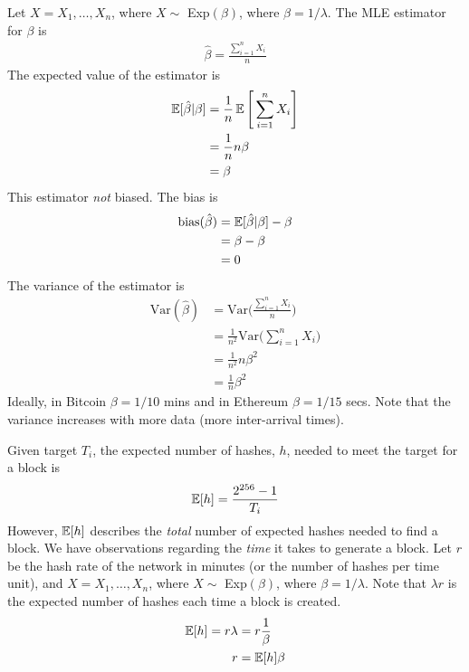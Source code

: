 Let $X = X_1, \dots, X_{n}$, where $X \sim$ Exp$(\beta)$, where $\beta = 1/\lambda$. The MLE estimator for $\beta$ is
\begin{align}
\hat{\beta} = \frac{\sum_{i=1}^{n} X_i}{n}
\end{align}
The expected value of the estimator is 
\begin{align}
\operatorname{\mathbb{E}}[\hat{\beta} | \beta] &= \frac{1}{n}\operatorname{\mathbb{E}} \Bigg[\sum_{i=1}^{n} X_i \Bigg] \\
&= \frac{1}{n}n\beta \\
&= \beta
\end{align}
This estimator \textit{not} biased. The bias is
\begin{align}
\text{bias}(\hat{\beta}) &= \operatorname{\mathbb{E}}[\hat{\beta} | \beta] - \beta \\
&= \beta - \beta \\
&= 0
\end{align}
The variance of the estimator is
\begin{align}
\text{Var}(\hat{\beta}) &= \text{Var}\Bigg(\frac{\sum_{i=1}^{n} X_i}{n}\Bigg) \\
&= \frac{1}{n^2} \text{Var}\Bigg(\sum_{i=1}^{n} X_i\Bigg) \\
&= \frac{1}{n^2} n\beta^2\\
&= \frac{1}{n}\beta^2
\end{align}
Ideally, in Bitcoin $\beta = 1/10$ mins and in Ethereum $\beta = 1/15$ secs. Note that the variance increases with more data (more inter-arrival times).

Given target $T_i$, the expected number of hashes, $h$, needed to meet the target for a block is
\begin{align}
\operatorname{\mathbb{E}}[h] = \frac{2^{256}-1}{T_i}
\end{align}
However, $\operatorname{\mathbb{E}}[h]$ describes the \textit{total} number of expected hashes needed to find a block. We have observations regarding the \textit{time} it takes to generate a block. Let $r$ be the hash rate of the network in minutes (or the number of hashes per time unit), and $X = X_1, \dots, X_{n}$, where $X \sim$ Exp$(\beta)$, where $\beta = 1/\lambda$. Note that $\lambda r$ is the expected number of hashes each time a block is created.  %
\begin{align}
\operatorname{\mathbb{E}}[h] = r \lambda &= r \frac{1}{\beta}  \\
r &= \operatorname{\mathbb{E}}[h] \beta
\end{align}


